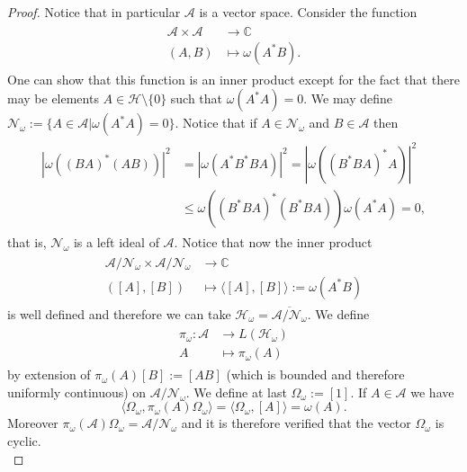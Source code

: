 \begin{proof}
Notice that in particular $\mathcal{A}$ is a vector space. Consider the function
\begin{align}
\begin{split}
\mathcal{A}\times\mathcal{A}&\rightarrow\mathbb{C} \\
(A,B)&\mapsto\omega(A^*B).
\end{split}
\end{align}
One can show that this function is an inner product except for the fact that there may be elements $A\in\mathcal{H}\setminus\{0\}$ such that $\omega(A^*A)=0$. We may define $\mathcal{N}_\omega := \{A\in\mathcal{A}|\omega(A^*A)=0\}$. Notice that if $A\in\mathcal{N}_\omega$ and $B\in\mathcal{A}$ then 
\begin{align}
\begin{split}
|\omega((BA)^*(AB))|^2&=|\omega(A^*B^*BA)|^2=|\omega((B^*BA)^*A)|^2 \\
&\leq\omega((B^*BA)^*(B^*BA))\omega(A^*A)=0,
\end{split}
\end{align}
that is, $\mathcal{N}_\omega$ is a left ideal of $\mathcal{A}$. Notice that now the inner product
\begin{align}
\begin{split}
\mathcal{A}/\mathcal{N}_\omega\times\mathcal{A}/\mathcal{N}_\omega&\rightarrow\mathbb{C} \\
([A],[B])&\mapsto\langle[A],[B]\rangle:=\omega(A^*B)
\end{split}
\end{align}
is well defined and therefore we can take $\mathcal{H}_\omega=\overline{\mathcal{A}/\mathcal{N}_\omega}$. We define 
\begin{align}
\begin{split}
\pi_\omega:\mathcal{A}&\rightarrow L(\mathcal{H}_\omega) \\
A&\mapsto \pi_\omega(A)
\end{split}
\end{align}
by extension of $\pi_\omega(A)[B]:=[AB]$ (which is bounded and therefore uniformly continuous) on $\mathcal{A}/\mathcal{N}_\omega$. We define at last $\Omega_\omega:=[1]$. If $A\in\mathcal{A}$ we have
\begin{equation}\label{eqn:state_representation}
\langle \Omega_\omega, \pi_\omega(A)\Omega_\omega\rangle = \langle \Omega_\omega, [A]\rangle = \omega(A). 
\end{equation}
Moreover $\pi_\omega(\mathcal{A})\Omega_\omega = \mathcal{A}/\mathcal{N}_\omega$ and it is therefore verified that the vector $\Omega_\omega$ is cyclic. \\ 

\end{proof}
